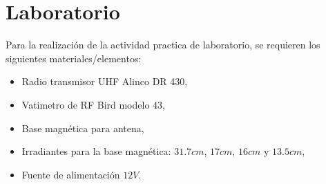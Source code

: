 \chapter{Laboratorio}
  Para la realización de la actividad practica de laboratorio, se requieren los siguientes materiales/elementos:
  \begin{itemize}
    \item Radio transmisor UHF Alinco DR 430,
    \item Vatimetro de RF Bird modelo 43,
    \item Base magnética para antena,
    \item Irradiantes para la base magnética: $31.7cm$, $17cm$, $16cm$ y $13.5cm$,
    \item Fuente de alimentación $12V$.
  \end{itemize}

